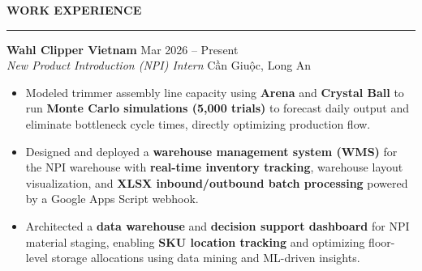 \documentclass[10pt,a4paper]{article}
\newcommand{\sectionrule}[1]{%
  {\large\textbf{#1}}\\[-4pt]
  {\rule{\linewidth}{0.8pt}}
}
\begin{document}
\vspace{10pt}

\sectionrule{WORK EXPERIENCE}
\textbf{Wahl Clipper Vietnam} \hfill {\small Mar 2026 -- Present}\\
{\small \textit{New Product Introduction (NPI) Intern} \hfill Cần Giuộc, Long An}
\begin{itemize}[topsep=2pt]
  \item {\small Modeled trimmer assembly line capacity using \textbf{Arena} and \textbf{Crystal Ball} to run \textbf{Monte Carlo simulations (5{,}000 trials)} to forecast daily output and eliminate bottleneck cycle times, directly optimizing production flow.}


  \item {\small Designed and deployed a \textbf{warehouse management system (WMS)} for the NPI warehouse with \textbf{real-time inventory tracking}, warehouse layout visualization, and \textbf{XLSX inbound/outbound batch processing} powered by a Google Apps Script webhook.}
  \item {\small Architected a \textbf{data warehouse} and \textbf{decision support dashboard} for NPI material staging, enabling \textbf{SKU location tracking} and optimizing floor-level storage allocations using data mining and ML-driven insights.}
\end{itemize}

\vspace{10pt}
\end{document}
